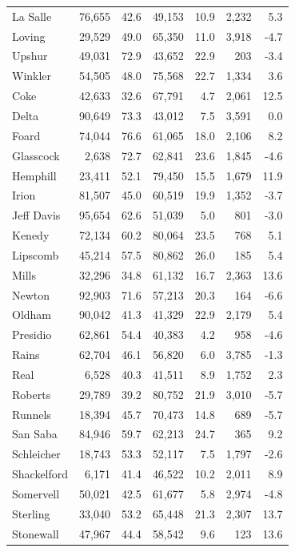 \documentclass[11pt]{article}
\begin{document}
\begin{landscape}
\begin{longtable}{lrrrrrr}
La Salle & 76,655 & 42.6 & 49,153 & 10.9 & 2,232 & 5.3 \\
Loving & 29,529 & 49.0 & 65,350 & 11.0 & 3,918 & -4.7 \\
Upshur & 49,031 & 72.9 & 43,652 & 22.9 & 203 & -3.4 \\
Winkler & 54,505 & 48.0 & 75,568 & 22.7 & 1,334 & 3.6 \\
Coke & 42,633 & 32.6 & 67,791 & 4.7 & 2,061 & 12.5 \\
Delta & 90,649 & 73.3 & 43,012 & 7.5 & 3,591 & 0.0 \\
Foard & 74,044 & 76.6 & 61,065 & 18.0 & 2,106 & 8.2 \\
Glasscock & 2,638 & 72.7 & 62,841 & 23.6 & 1,845 & -4.6 \\
Hemphill & 23,411 & 52.1 & 79,450 & 15.5 & 1,679 & 11.9 \\
Irion & 81,507 & 45.0 & 60,519 & 19.9 & 1,352 & -3.7 \\
Jeff Davis & 95,654 & 62.6 & 51,039 & 5.0 & 801 & -3.0 \\
Kenedy & 72,134 & 60.2 & 80,064 & 23.5 & 768 & 5.1 \\
Lipscomb & 45,214 & 57.5 & 80,862 & 26.0 & 185 & 5.4 \\
Mills & 32,296 & 34.8 & 61,132 & 16.7 & 2,363 & 13.6 \\
Newton & 92,903 & 71.6 & 57,213 & 20.3 & 164 & -6.6 \\
Oldham & 90,042 & 41.3 & 41,329 & 22.9 & 2,179 & 5.4 \\
Presidio & 62,861 & 54.4 & 40,383 & 4.2 & 958 & -4.6 \\
Rains & 62,704 & 46.1 & 56,820 & 6.0 & 3,785 & -1.3 \\
Real & 6,528 & 40.3 & 41,511 & 8.9 & 1,752 & 2.3 \\
Roberts & 29,789 & 39.2 & 80,752 & 21.9 & 3,010 & -5.7 \\
Runnels & 18,394 & 45.7 & 70,473 & 14.8 & 689 & -5.7 \\
San Saba & 84,946 & 59.7 & 62,213 & 24.7 & 365 & 9.2 \\
Schleicher & 18,743 & 53.3 & 52,117 & 7.5 & 1,797 & -2.6 \\
Shackelford & 6,171 & 41.4 & 46,522 & 10.2 & 2,011 & 8.9 \\
Somervell & 50,021 & 42.5 & 61,677 & 5.8 & 2,974 & -4.8 \\
Sterling & 33,040 & 53.2 & 65,448 & 21.3 & 2,307 & 13.7 \\
Stonewall & 47,967 & 44.4 & 58,542 & 9.6 & 123 & 13.6 \\

\end{longtable}
\end{landscape}
\end{document}
